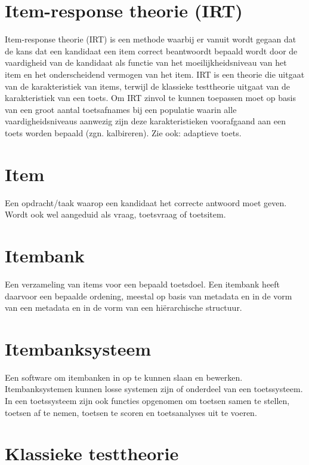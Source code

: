 \documentclass[
  letterpaper,
  DIV=11,
  numbers=noendperiod]{scrreprt}
\begin{document}
\hypertarget{item-response-theorie-irt}{%
\section{Item-response theorie (IRT)}\label{item-response-theorie-irt}}

Item-response theorie (IRT) is een methode waarbij er vanuit wordt
gegaan dat de kans dat een kandidaat een item correct beantwoordt
bepaald wordt door de vaardigheid van de kandidaat als functie van het
moeilijkheidsniveau van het item en het onderscheidend vermogen van het
item. IRT is een theorie die uitgaat van de karakteristiek van items,
terwijl de klassieke testtheorie uitgaat van de karakteristiek van een
toets. Om IRT zinvol te kunnen toepassen moet op basis van een groot
aantal toetsafnames bij een populatie waarin alle vaardigheidsniveaus
aanwezig zijn deze karakteristieken voorafgaand aan een toets worden
bepaald (zgn. kalbireren). Zie ook: adaptieve toets.

\hypertarget{item}{%
\section{Item}\label{item}}

Een opdracht/taak waarop een kandidaat het correcte antwoord moet geven.
Wordt ook wel aangeduid als vraag, toetsvraag of toetsitem.

\hypertarget{itembank}{%
\section{Itembank}\label{itembank}}

Een verzameling van items voor een bepaald toetsdoel. Een itembank heeft
daarvoor een bepaalde ordening, meestal op basis van metadata en in de
vorm van een metadata en in de vorm van een hiërarchische structuur.

\hypertarget{itembanksysteem}{%
\section{Itembanksysteem}\label{itembanksysteem}}

Een software om itembanken in op te kunnen slaan en bewerken.
Itembanksystemen kunnen losse systemen zijn of onderdeel van een
toetssysteem. In een toetssysteem zijn ook functies opgenomen om toetsen
samen te stellen, toetsen af te nemen, toetsen te scoren en
toetsanalyses uit te voeren.

\hypertarget{klassieke-testtheorie}{%
\section{Klassieke testtheorie}\label{klassieke-testtheorie}}
\end{document}
